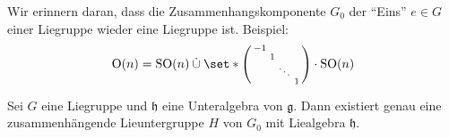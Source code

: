Wir erinnern daran, dass die Zusammenhangskomponente $G_0$ der \enquote{Eins} $e \in G$ einer Liegruppe wieder eine Liegruppe ist.
Beispiel: 
\[
	\On(n)= \SO(n) \mathbin{\dot{\cup}} \set*{ \begin{psmallmatrix}
		-1 & & &\\
		& 1 &  &\\
		& & \ddots & \\
		& & & 1
	\end{psmallmatrix} \cdot \SO(n)}
\]

\begin{satz}[label=satz:125,{name=[Lieuntergruppe zu Lieunteralgebra]}]
	Sei $G$ eine Liegruppe und $\mathfrak{h}$ eine Unteralgebra von $\mathfrak{g}$.
	Dann existiert genau eine zusammenhängende Lieuntergruppe $H$ von $G_0$ mit Liealgebra $\mathfrak{h}$. 
\end{satz}
